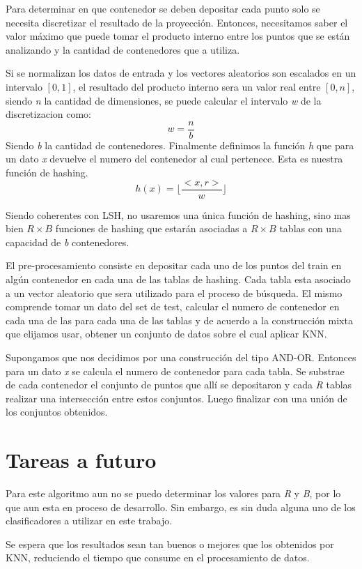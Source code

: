 Para determinar en que contenedor se deben depositar cada punto solo se necesita discretizar el resultado de la proyección. Entonces, necesitamos saber el valor máximo que puede tomar el producto interno entre los puntos que se están analizando y la cantidad de contenedores que a utiliza.

Si se normalizan los datos de entrada y los vectores aleatorios son escalados en un intervalo $ [0,1] $, el resultado del producto interno sera un valor real entre $ [0,n] $, siendo \textit{n} la cantidad de dimensiones, se puede calcular el intervalo \textit{w} de la discretizacion como:
\[ w = \frac{n}{b} \]
Siendo \textit{b} la cantidad de contenedores. Finalmente definimos la función \textit{h} que para un dato \textit{x} devuelve el numero del contenedor al cual pertenece. Esta es nuestra función de hashing.
\[ h(x) = \lfloor \frac{<x,r>}{w} \rfloor  \]

Siendo coherentes con LSH, no usaremos una única función de hashing, sino mas bien $ R \times B $ funciones de hashing que estarán asociadas a $ R\times B $ tablas con una capacidad de \textit{b} contenedores.

El pre-procesamiento consiste en depositar cada uno de los puntos del train en algún contenedor en cada una de las tablas de hashing. Cada tabla esta asociado a un vector aleatorio que sera utilizado para el proceso de búsqueda. El mismo comprende tomar un dato del set de test, calcular el numero de contenedor en cada una de las para cada una de las tablas y de acuerdo a la construcción mixta que elijamos usar, obtener un conjunto de datos sobre el cual aplicar KNN. 

Supongamos que nos decidimos por una construcción del tipo AND-OR. Entonces para un dato \textit{x} se calcula el numero de contenedor para cada tabla. Se substrae de cada contenedor el conjunto de puntos que allí se depositaron y cada \textit{R} tablas realizar una intersección entre estos conjuntos. Luego finalizar con una unión de los conjuntos obtenidos.

\section{Tareas a futuro}
Para este algoritmo aun no se puedo determinar los valores para \textit{R} y \textit{B}, por lo que aun esta en proceso de desarrollo. Sin embargo, es sin duda alguna uno de los clasificadores a utilizar en este trabajo.

Se espera que los resultados sean tan buenos o mejores que los obtenidos por KNN, reduciendo el tiempo que consume en el procesamiento de datos. 

